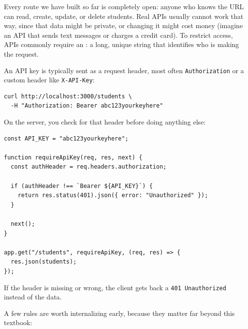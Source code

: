 Every route we have built so far is completely open: anyone who knows
the URL can read, create, update, or delete students. Real APIs
usually cannot work that way, since that data might be private, or
changing it might cost money (imagine an API that sends text messages
or charges a credit card). To restrict access, APIs commonly require
an : a long, unique string that identifies who is
making the request.

An API key is typically sent as a request header, most often
\texttt{Authorization} or a custom header like \texttt{X-API-Key}:

\begin{verbatim}
curl http://localhost:3000/students \
  -H "Authorization: Bearer abc123yourkeyhere"
\end{verbatim}

On the server, you check for that header before doing anything else:

\begin{verbatim}
const API_KEY = "abc123yourkeyhere";
 
function requireApiKey(req, res, next) {
  const authHeader = req.headers.authorization;
 
  if (authHeader !== `Bearer ${API_KEY}`) {
    return res.status(401).json({ error: "Unauthorized" });
  }
 
  next();
}
 
app.get("/students", requireApiKey, (req, res) => {
  res.json(students);
});
\end{verbatim}

If the header is missing or wrong, the client gets back a
\texttt{401 Unauthorized} instead of the data.

A few rules are worth internalizing early, because they matter far
beyond this textbook:

